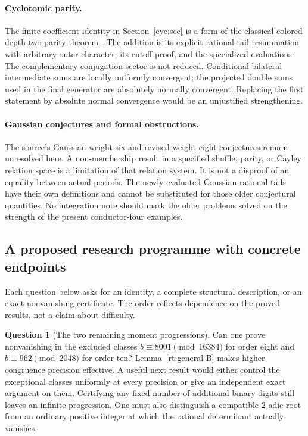 \documentclass[11pt,a4paper]{article}
\numberwithin{equation}{section}
\theoremstyle{definition}
\newtheorem{question}{Question}
\theoremstyle{remark}
\begin{document}
\paragraph{Cyclotomic parity.}
The finite coefficient identity in Section~\ref{cyc:sec} is a form
of the classical colored depth-two parity theorem \cite{PanzerParity}.
The addition is its explicit rational-tail resummation with arbitrary
outer character, its cutoff proof, and the specialized evaluations.
The complementary conjugation sector is not reduced. Conditional
bilateral intermediate sums are locally uniformly convergent; the
projected double sums used in the final generator are absolutely
normally convergent. Replacing the first statement by absolute normal
convergence would be an unjustified strengthening.

\paragraph{Gaussian conjectures and formal obstructions.}
The source's Gaussian weight-six and revised weight-eight conjectures
remain unresolved here. A non-membership result in a specified
shuffle, parity, or Cayley relation space is a limitation of that
relation system. It is not a disproof of an equality between actual
periods. The newly evaluated Gaussian rational tails have their own
definitions and cannot be substituted for those older conjectural
quantities. No integration note should mark the older problems solved
on the strength of the present conductor-four examples.

\subsection{A proposed research programme with concrete endpoints}

Each question below asks for an identity, a complete structural
description, or an exact nonvanishing certificate. The order reflects
dependence on the proved results, not a claim about difficulty.

\begin{question}[The two remaining moment progressions]
Can one prove nonvanishing in the excluded classes
$b\equiv8001\pmod{16384}$ for order eight and
$b\equiv962\pmod{2048}$ for order ten?
Lemma~\ref{rt:general-B} makes higher congruence precision effective.
A useful next result would either control the exceptional classes
uniformly at every precision or give an independent exact argument on
them. Certifying any fixed number of additional binary digits still
leaves an infinite progression. One must also distinguish a compatible
$2$-adic root from an ordinary positive integer at which the rational
determinant actually vanishes.
\end{question}
\end{document}
